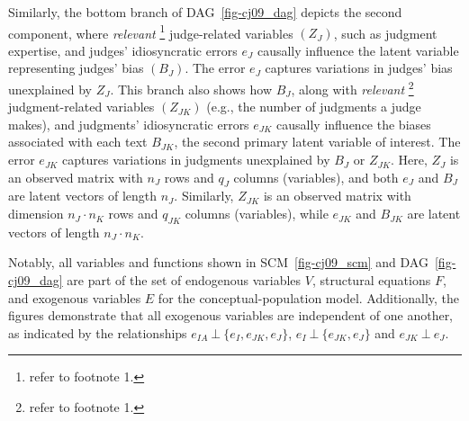 \documentclass[
  authoryear,
  review,
  1p]{elsarticle}
\begin{document}
Similarly, the bottom branch of DAG~\ref{fig-cj09_dag} depicts the
second component, where \emph{relevant} \footnote{refer to footnote 1.}
judge-related variables \((Z_{J})\), such as judgment expertise, and
judges' idiosyncratic errors \(e_{J}\) causally influence the latent
variable representing judges' bias \((B_{J})\). The error \(e_{J}\)
captures variations in judges' bias unexplained by \(Z_{J}\). This
branch also shows how \(B_{J}\), along with \emph{relevant} \footnote{refer
  to footnote 1.} judgment-related variables \((Z_{JK})\) (e.g., the
number of judgments a judge makes), and judgments' idiosyncratic errors
\(e_{JK}\) causally influence the biases associated with each text
\(B_{JK}\), the second primary latent variable of interest. The error
\(e_{JK}\) captures variations in judgments unexplained by \(B_{J}\) or
\(Z_{JK}\). Here, \(Z_{J}\) is an observed matrix with \(n_{J}\) rows
and \(q_{J}\) columns (variables), and both \(e_{J}\) and \(B_{J}\) are
latent vectors of length \(n_{J}\). Similarly, \(Z_{JK}\) is an observed
matrix with dimension \(n_{J} \cdot n_{K}\) rows and \(q_{JK}\) columns
(variables), while \(e_{JK}\) and \(B_{JK}\) are latent vectors of
length \(n_{J} \cdot n_{K}\).

Notably, all variables and functions shown in SCM~\ref{fig-cj09_scm} and
DAG~\ref{fig-cj09_dag} are part of the set of endogenous variables
\(V\), structural equations \(F\), and exogenous variables \(E\) for the
conceptual-population model. Additionally, the figures demonstrate that
all exogenous variables are independent of one another, as indicated by
the relationships \(e_{IA} \:\bot\:\{ e_{I}, e_{JK}, e_{J} \}\),
\(e_{I} \:\bot\:\{ e_{JK}, e_{J} \}\) and \(e_{JK} \:\bot\:e_{J}\).
\end{document}
